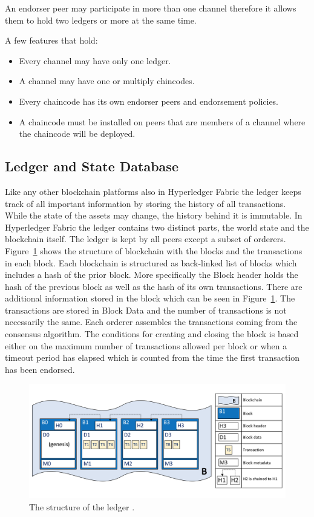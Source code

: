 An endorser peer may participate in more than one channel therefore it allows them to hold two ledgers or more at the same time. 

A few features that hold: 
\begin{itemize}
  \item Every channel may have only one ledger.
  \item A channel may have one or multiply chincodes.
  \item Every chaincode has its own endorser peers and endorsement policies.
  \item A chaincode must be installed on peers that are members of a channel where the chaincode will be deployed. 
  \end{itemize}


\subsection{Ledger and State Database}

Like any other blockchain platforms also in Hyperledger Fabric the ledger keeps track of all important information by storing the history of all transactions. While the state of the assets may change, the history behind it is immutable. In Hyperledger Fabric the ledger contains two distinct parts, the world state and the blockchain itself. 
The ledger is kept by all peers except a subset of orderers. 
Figure~\ref{fig:ledgerdiagram} shows the structure of blockchain with the blocks and the transactions in each block. Each blockchain is structured as back-linked list of blocks which includes a hash of the prior block. More specifically the Block header holds the hash of the previous block as well as the hash of its own transactions. There are additional information stored in the block which can be seen in  Figure~\ref{fig:ledgerdiagram}. The transactions are stored in Block Data and the number of transactions is not necessarily the same. Each orderer assembles the transactions coming from the consensus algorithm. The conditions for creating and closing the block is based either on the maximum number of transactions allowed per block or when a timeout period has elapsed which is counted from the time the first transaction has been endorsed. 

\begin{figure}[!htb]
    \centering
    \includegraphics[width=1\textwidth]{figures/ledgediagram.png}
    \caption{The structure of the ledger \cite{ledger}. }
    \label{fig:ledgerdiagram}
\end{figure}

